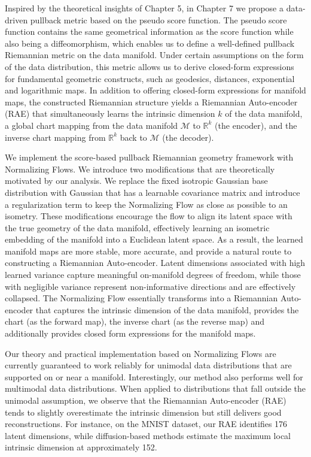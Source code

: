 Inspired by the theoretical insights of Chapter 5, in Chapter 7 we propose a data-driven pullback metric based on the pseudo score function. The pseudo score function contains the same geometrical information as the score function while also being a diffeomorphism, which enables us to define a well-defined pullback Riemannian metric on the data manifold. Under certain assumptions on the form of the data distribution, this metric allows us to derive closed-form expressions for fundamental geometric constructs, such as geodesics, distances, exponential and logarithmic maps. In addition to offering closed-form expressions for manifold maps, the constructed Riemannian structure yields a Riemannian Auto-encoder (RAE) that simultaneously learns the intrinsic dimension \( k \) of the data manifold, a global chart mapping from the data manifold \(\mathcal{M}\) to \(\mathbb{R}^k\) (the encoder), and the inverse chart mapping from \(\mathbb{R}^k\) back to \(\mathcal{M}\) (the decoder).

We implement the score-based pullback Riemannian geometry framework with Normalizing Flows. We introduce two modifications that are theoretically motivated by our analysis. We replace the fixed isotropic Gaussian base distribution with Gaussian that has a learnable covariance matrix and introduce a regularization term to keep the Normalizing Flow as close as possible to an isometry. These modifications encourage the flow to align its latent space with the true geometry of the data manifold, effectively learning an isometric embedding of the manifold into a Euclidean latent space. As a result, the learned manifold maps are more stable, more accurate, and provide a natural route to constructing a Riemannian Auto-encoder. Latent dimensions associated with high learned variance capture meaningful on-manifold degrees of freedom, while those with negligible variance represent non-informative directions and are effectively collapsed. The Normalizing Flow essentially transforms into a Riemannian Auto-encoder that captures the intrinsic dimension of the data manifold, provides the chart (as the forward map), the inverse chart (as the reverse map) and additionally provides closed form expressions for the manifold maps. 


Our theory and practical implementation based on Normalizing Flows are currently guaranteed to work reliably for unimodal data distributions that are supported on or near a manifold. Interestingly, our method also performs well for multimodal data distributions. When applied to distributions that fall outside the unimodal assumption, we observe that the Riemannian Auto-encoder (RAE) tends to slightly overestimate the intrinsic dimension but still delivers good reconstructions. For instance, on the MNIST dataset, our RAE identifies 176 latent dimensions, while diffusion-based methods estimate the maximum local intrinsic dimension at approximately 152.

